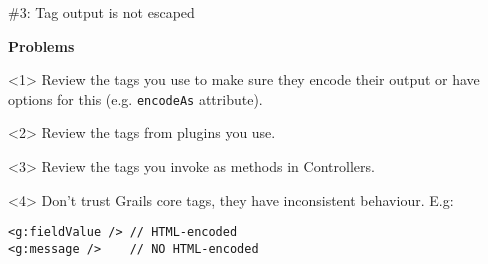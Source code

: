 \begin{frame}

  \vspace{.5cm}

  \begin{center}
    \Huge \#3: Tag output is not escaped
  \end{center}

  \vspace{1cm}

    \Large
    \textbf{Problems} \\[1em]

    \begin{onlyenv}<1>
      Review the tags you use to make sure they encode their output
      or have options for this (e.g. \verb|encodeAs| attribute).
    \end{onlyenv}

    \begin{onlyenv}<2>
      Review the tags from plugins you use.
    \end{onlyenv}

    \begin{onlyenv}<3>
      Review the tags you invoke as methods in Controllers.
    \end{onlyenv}

    \begin{onlyenv}<4>
      Don't trust Grails core tags, they have inconsistent behaviour. E.g:
      \begin{center}
        \begin{minipage}{.9\textwidth}
          \begin{verbatim}
<g:fieldValue /> // HTML-encoded
<g:message />    // NO HTML-encoded
          \end{verbatim}
        \end{minipage}
      \end{center}
    \end{onlyenv}

    \vfill

\end{frame}


